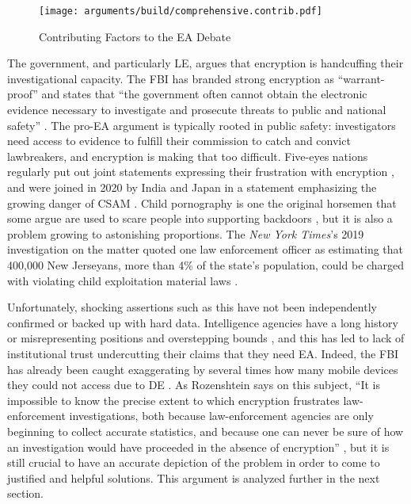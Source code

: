 \begin{sidewaysfigure}
  \centering\CaptionFontSize
  \texttt{[image: arguments/build/comprehensive.contrib.pdf]}
  \caption[Contributing Factors to the EA Debate]{Contributing Factors to the EA Debate}
  \label{fig-args-contrib}
\end{sidewaysfigure}

The government, and particularly \acl{LE}, argues that encryption is handcuffing their investigational capacity. The
\ac{FBI} has branded strong encryption as ``warrant-proof'' and states that ``the government often cannot obtain the
electronic evidence necessary to investigate and prosecute threats to public and national safety'' \cite{fbi_2020}. The
pro-\ac{EA} argument is typically rooted in public safety: investigators need access to evidence to fulfill their
commission to catch and convict lawbreakers, and encryption is making that too difficult. Five-eyes nations regularly
put out joint statements expressing their frustration with encryption \cite{ministerial_2018} \cite{goodale_2017}, and
were joined in 2020 by India and Japan in a statement emphasizing the growing danger of \ac{CSAM} \cite{intl_2020}.
Child pornography is one the original \ac{horsemen} that some argue are used to scare people into supporting backdoors
\cite{schneier_scaring_2019}, but it is also a problem growing to astonishing proportions. The \textit{New York Times}'s
2019 investigation on the matter quoted one law enforcement officer as estimating that 400,000 New Jerseyans, more than
4\% of the state's population, could be charged with violating child exploitation material laws
\cite{keller_internet_2019}.

Unfortunately, shocking assertions such as this have not been independently confirmed or backed up with hard data.
Intelligence agencies have a long history or misrepresenting positions and overstepping bounds
\cite{johnson_congressional_2004} \cite{shamsi_2011}, and this has led to lack of institutional trust undercutting their
claims that they need \ac{EA}. Indeed, the \ac{FBI} has already been caught exaggerating by several times how many
mobile devices they could not access due to \acl{DE} \cite{devlin_2018}. As Rozenshtein says on this subject, ``It is
impossible to know the precise extent to which encryption frustrates law-enforcement investigations, both because
law-enforcement agencies are only beginning to collect accurate statistics, and because one can never be sure of how an
investigation would have proceeded in the absence of encryption'' \cite{rozenshtein_wicked_2018}, but it is still
crucial to have an accurate depiction of the problem in order to come to justified and helpful solutions. This argument
is analyzed further in the next section.

